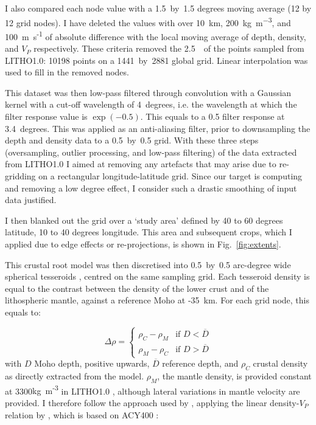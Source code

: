 I also compared each node value with a {1.5}~by~{1.5} degrees moving average (12 by 12 grid nodes). I have deleted the values with over 10~\si{\kilo \metre}, 200~\si{\kilo \gram \per \cubic \metre}, and 100~{m~s\textsuperscript{-1}} of absolute difference with the local moving average of depth, density, and $V_P$ respectively.
These criteria removed the {2.5}~\textperthousand~of the points sampled from {LITHO1.0}: 10198 points on a 1441~by~2881 global grid.
Linear interpolation was used to fill in the removed nodes.

This dataset was then low-pass filtered through convolution with a Gaussian kernel with a cut-off wavelength of 4~degrees, i.e. the wavelength at which the filter response value is $\exp(-0.5)$.
This equals to a {0.5} filter response at {3.4}~degrees.
This was applied as an anti-aliasing filter, prior to downsampling the depth and density data to a {0.5}~by~{0.5} grid.
With these three steps (oversampling, outlier processing, and low-pass filtering) of the data extracted from {LITHO1.0} I aimed at removing any artefacts that may arise due to re-gridding on a rectangular longitude-latitude grid.
Since our target is computing and removing a low degree effect, I consider such a drastic smoothing of input data justified.

I then blanked out the grid over a `study area' defined by 40 to 60 degrees latitude, 10 to 40 degrees longitude.
This area and subsequent crops, which I applied due to edge effects or re-projections, is shown in Fig.~\ref{fig:extents}.

This crustal root model was then discretised into {0.5}~by~{0.5} arc-degree wide spherical tesseroids \parencite{Uieda2016}, centred on the same sampling grid.
Each tesseroid density is equal to the contrast between the density of the lower crust and of the lithospheric mantle, against a reference Moho at {-35}~\si{\kilo \metre}.
For each grid node, this equals to:

\begin{equation}
	\label{eq:RhoContrast}
	\Delta \rho = \begin{cases}
		\rho_{C} - \rho_{M} & \mbox{if } D < \overline{D} \\ 
	    \rho_{M} - \rho_{C} & \mbox{if } D > \overline{D}
    \end{cases}
\end{equation}
with $D$ Moho depth, positive upwards, $\overline{D}$ reference depth, and $\rho_{C}$ crustal density as directly extracted from the model.
$\rho_{M}$, the mantle density, is provided constant at 3300{kg~m\textsuperscript{-3}} in {LITHO1.0} \parencite{Pasyanos2014}, although lateral variations in mantle velocity are provided.
I therefore follow the approach used by \textcite{Sebera2018}, applying the linear density-$V_P$ relation by \textcite{Yegorova2015}, which is based on {ACY400} \parencite{Montagner1989}:

